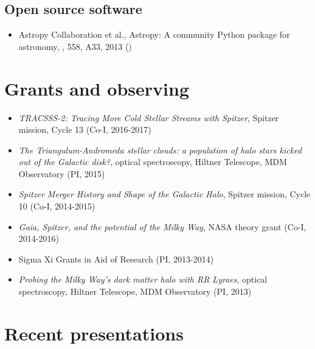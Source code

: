 \documentclass[12pt,letterpaper]{article}
\begin{document}
    \subsection*{Open source software}
    \begin{itemize}

\item Astropy Collaboration et al.,
    {Astropy: A community Python package for astronomy},
    \aanda, 558, A33, 2013 ()

	\end{itemize}

\section*{Grants and observing }

	\begin{itemize}
    \item {\it TRACSSS-2: Tracing More Cold Stellar Streams with Spitzer}, Spitzer mission, Cycle 13 (Co-I, 2016-2017)
	\item {\it The Triangulum-Andromeda stellar clouds: a population of halo stars kicked out of the Galactic disk?}, optical spectroscopy, Hiltner Telescope, MDM Observatory (PI, 2015)
	\item {\it Spitzer Merger History and Shape of the Galactic Halo}, Spitzer mission, Cycle 10 (Co-I, 2014-2015)
	\item {\it Gaia, Spitzer, and the potential of the Milky Way}, NASA theory grant (Co-I, 2014-2016)
	\item Sigma Xi Grants in Aid of Research (PI, 2013-2014)
	\item {\it Probing the Milky Way's dark matter halo with RR Lyraes}, optical spectroscopy, Hiltner Telescope, MDM Observatory (PI, 2013)
	\end{itemize}

\section*{Recent presentations}
\end{document}
